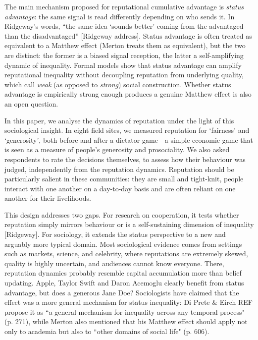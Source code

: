 \documentclass{article}
\begin{document}
\bigbreak
The main mechanism proposed for reputational cumulative advantage is \textit{status advantage}: the same signal is read differently depending on who sends it. In Ridgeway's words, ``the same idea `sounds better' coming from the advantaged than the disadvantaged'' [Ridgeway address]. Status advantage is often treated as equivalent to a Matthew effect (Merton treats them as equivalent), but the two are distinct: the former is a biased signal reception, the latter a self-amplifying dynamic of inequality. Formal models show that status advantage can amplify reputational inequality without decoupling reputation from underlying quality, which \citet{lynn_sociological_2009} call \textit{weak} (as opposed to \textit{strong}) social construction. Whether status advantage is empirically strong enough produces a genuine Matthew effect is also an open question.

In this paper, we analyse the dynamics of reputation under the light of this sociological insight. In eight field sites, we measured reputation for `fairness' and `generosity', both before and after a dictator game  - a simple economic game that is seen as a measure of people's generosity and prosociality. We also asked respondents to rate the decisions themselves, to assess how their behaviour was judged, independently from the reputation dynamics. Reputation should be particularly salient in these communities: they are small and tight-knit, people interact with one another on a day-to-day basis and are often reliant on one another for their livelihoods. 


This design addresses two gaps. For research on cooperation, it tests whether reputation simply mirrors behaviour or is a self-sustaining dimension of inequality [Ridgeway]. For sociology, it extends the status perspective to a new and arguably more typical domain. Most sociological evidence comes from settings such as markets, science, and celebrity, where reputations are extremely skewed, quality is highly uncertain, and audiences cannot know everyone. There, reputation dynamics probably resemble capital accumulation more than belief updating. Apple, Taylor Swift and Daron Acemoglu clearly benefit from status advantage, but does a generous Jane Doe? Sociologists have claimed that the effect was a more general mechanism for status inequality: Di Prete \& Eirch REF propose it as ``a general mechanism for inequality across any temporal process" (p. 271), while Merton also mentioned that his Matthew effect should apply not only to academia but also to ``other domains of social life" (p. 606). 
\end{document}
